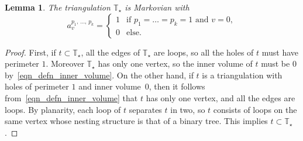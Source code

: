 \documentclass[10pt]{amsart}
\newtheorem{lemm}[theo]{Lemma}\newtheorem{prop}[theo]{Proposition}\newtheorem{coro}[theo]{Corollary}\newtheorem{conj}[theo]{Conjecture}
\theoremstyle{definition}\newtheorem{defi}[theo]{Definition}\newtheorem{rema}[theo]{Remark}\newtheorem{exam}[theo]{Example}\newtheorem{exem}[theo]{Example}\newtheorem{nota}[theo]{Notation}
\newcommand{\TT}{\mathbb{T}}
\begin{document}
\begin{lemm}\label{lem_Tstar}
The triangulation $\TT_{\star}$ is Markovian with
\[
a^{p_1,\, \dots,\,p_k}_v =
\begin{cases}
1 & \text{if }p_1=\dots=p_k=1\text{ and }v=0,\\
0 & \text{else.}
\end{cases}
\]
\end{lemm}

\begin{proof}
First, if $t \subset \TT_{\star}$, all the edges of $\TT_{\star}$ are loops, so all the holes of $t$ must have perimeter $1$. Moreover $\TT_{\star}$ has only one vertex, so the inner volume of $t$ must be $0$ by~\eqref{eqn_defn_inner_volume}. On the other hand, if $t$ is a triangulation with holes of perimeter $1$ and inner volume~$0$, then it follows from~\eqref{eqn_defn_inner_volume} that $t$ has only one vertex, and all the edges are loops. By planarity, each loop of $t$ separates $t$ in two, so $t$ consists of loops on the same vertex whose nesting structure is that of a binary tree. This implies $t \subset \TT_{\star}$.
\end{proof}
\end{document}
